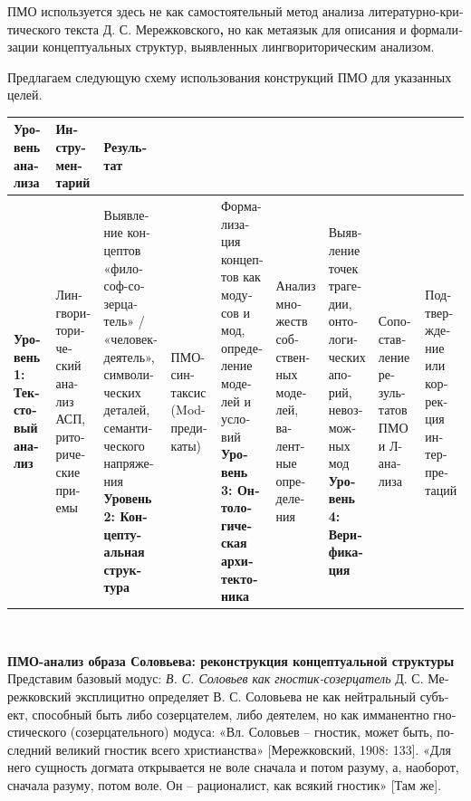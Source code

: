 \begin{russian}
    ПМО используется здесь не как самостоятельный метод анализа литературно-критического текста Д. С. Мережковского\textbf{, }но как\textbf{ }метаязык для описания и формализации концептуальных структур, выявленных лингвориторическим анализом.

    Предлагаем следующую схему использования конструкций ПМО для указанных целей. 

    \begin{adjustbox}{center}\begin{tabular}{ |l|l|l|l| }
      \hline
      {\centering \textbf{Уровень анализа} \par} & {\centering \textbf{Инструментарий} \par} & {\centering \textbf{Результат} \par} &  \\
      \hline
      \textbf{Уровень 1: Текстовый анализ} & Лингвориторический анализ АСП, риторические приемы & Выявление концептов «философ-созерцатель» / «человек-деятель», символических деталей, семантического напряжения \ 
      \hline
      \textbf{Уровень 2: Концептуальная структура} & ПМО-синтаксис (Mod-предикаты) & Формализация концептов как модусов и мод, определение моделей и условий \ 
      \hline
      \textbf{Уровень 3: Онтологическая архитектоника} & Анализ множеств собственных моделей, валентные определения & Выявление точек трагедии, онтологических апорий, невозможных мод \ 
      \hline
      \textbf{Уровень 4: Верификация} & Сопоставление результатов ПМО и Л-анализа & Подтверждение или коррекция интерпретаций \ 
      \hline
    \end{tabular}\end{adjustbox}\

    \textbf{ПМО-анализ образа Соловьева: реконструкция концептуальной структуры}
    Представим базовый модус: \textit{В. С. Соловьев как гностик-созерцатель}
    Д. С. Мережковский эксплицитно определяет В. С. Соловьева не как нейтральный субъект, способный быть либо созерцателем, либо деятелем, но как имманентно гностического (созерцательного) модуса:
    «Вл. Соловьев – гностик, может быть, последний великий гностик всего христианства» [Мережковский, 1908: 133].
    «Для него сущность догмата открывается не воле сначала и потом разуму, а, наоборот, сначала разуму, потом воле. Он – рационалист, как всякий гностик» [Там же].


\end{russian}
